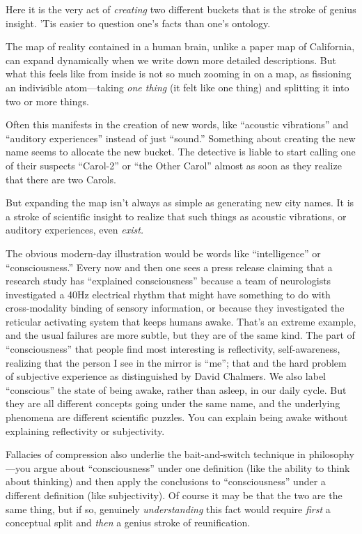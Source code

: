 {
 Here it is the very act of \textit{creating} two different buckets
that is the stroke of genius insight. 'Tis easier to
question one's facts than one's
ontology.}

{
 The map of reality contained in a human brain, unlike a paper map
of California, can expand dynamically when we write down more detailed
descriptions. But what this feels like from inside is not so much
zooming in on a map, as fissioning an indivisible atom---taking
\textit{one thing} (it felt like one thing) and splitting it into two
or more things.}

{
 Often this manifests in the creation of new words, like
``acoustic vibrations'' and
``auditory experiences'' instead of
just ``sound.'' Something about
creating the new name seems to allocate the new bucket. The detective
is liable to start calling one of their suspects
``Carol-2'' or
``the Other Carol'' almost as soon
as they realize that there are two Carols.}

{
 But expanding the map isn't always as simple as
generating new city names. It is a stroke of scientific insight to
realize that such things as acoustic vibrations, or auditory
experiences, even \textit{exist.}}

{
 The obvious modern-day illustration would be words like
``intelligence'' or
``consciousness.'' Every now and
then one sees a press release claiming that a research study has
``explained consciousness'' because
a team of neurologists investigated a 40Hz electrical rhythm that might
have something to do with cross-modality binding of sensory
information, or because they investigated the reticular activating
system that keeps humans awake. That's an extreme
example, and the usual failures are more subtle, but they are of the
same kind. The part of
``consciousness'' that people find
most interesting is reflectivity, self-awareness, realizing that the
person I see in the mirror is
``me''; that and the hard problem of
subjective experience as distinguished by David Chalmers. We also label
``conscious'' the state of being
awake, rather than asleep, in our daily cycle. But they are all
different concepts going under the same name, and the underlying
phenomena are different scientific puzzles. You can explain being awake
without explaining reflectivity or subjectivity.}

{
 Fallacies of compression also underlie the bait-and-switch
technique in philosophy---you argue about
``consciousness'' under one
definition (like the ability to think about thinking) and then apply
the conclusions to ``consciousness''
under a different definition (like subjectivity). Of course it may be
that the two are the same thing, but if so, genuinely
\textit{understanding} this fact would require \textit{first} a
conceptual split and \textit{then} a genius stroke of reunification.}

